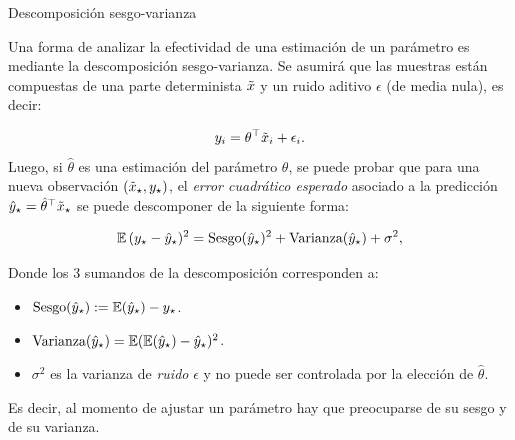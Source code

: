 \documentclass[handout, 9pt]{beamer}
\begin{document}
\begin{frame}{Descomposición sesgo-varianza}

Una forma de analizar la efectividad de una estimación de un parámetro es mediante la descomposición sesgo-varianza. Se asumirá que las muestras están compuestas de una parte determinista $\tilde{x}$ y un ruido aditivo $\epsilon$ (de media nula), es decir:

\begin{equation*}
	y_i = \theta^\top\tilde{x}_i + \epsilon_i.
 \end{equation*}\pause
Luego, si $\hat\theta$ es una estimación del parámetro $\theta$, se puede probar que para una nueva observación $(\tilde{x}_\star,y_\star)$, el \emph{error cuadrático esperado} asociado a la predicción $\hat y_\star = \hat\theta^\top \tilde{x}_\star$ se puede descomponer de la siguiente forma:
 
\begin{equation*}
 	\operatorname{\mathbb{E}}{(y_\star - \hat y_\star)^2} = \text{Sesgo}(\hat y_\star)^2 + \text{Varianza}(\hat y_\star) + \sigma^2,\label{eq:expected_sq_loss}
 \end{equation*}

Donde los 3 sumandos de la descomposición corresponden a:\pause
 \begin{itemize}
 	\item $\text{Sesgo}(\hat y_\star) := \operatorname{\mathbb{E}}(\hat y_\star) - y_\star$.\pause
 	\item $\text{Varianza}(\hat y_\star) = \operatorname{\mathbb{E}}(\operatorname{\mathbb{E}}(\hat y_\star)- \hat y_\star)^2$.\pause
 	\item $\sigma^2$ es la varianza de \emph{ruido} $\epsilon$ y no puede ser controlada por la elección de $\hat\theta$.\pause
 \end{itemize}
 
 Es decir, al momento de ajustar un parámetro hay que preocuparse de su sesgo y de su varianza.

\end{frame}
\end{document}
